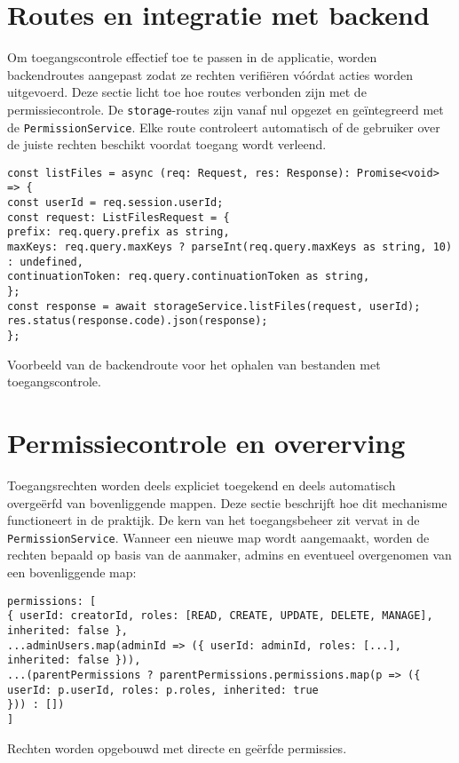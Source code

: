 \section{Routes en integratie met backend}
\label{sec:routes-backend}
Om toegangscontrole effectief toe te passen in de applicatie, worden backendroutes aangepast zodat ze rechten verifiëren vóórdat acties worden uitgevoerd. Deze sectie licht toe hoe routes verbonden zijn met de permissiecontrole.
De \texttt{storage}-routes zijn vanaf nul opgezet en geïntegreerd met de \texttt{PermissionService}. Elke route controleert automatisch of de gebruiker over de juiste rechten beschikt voordat toegang wordt verleend.
\begin{listing}[H]
\begin{verbatim}
const listFiles = async (req: Request, res: Response): Promise<void> => {
const userId = req.session.userId;
const request: ListFilesRequest = {
prefix: req.query.prefix as string,
maxKeys: req.query.maxKeys ? parseInt(req.query.maxKeys as string, 10) : undefined,
continuationToken: req.query.continuationToken as string,
};
const response = await storageService.listFiles(request, userId);
res.status(response.code).json(response);
};
\end{verbatim}
\caption[Route voor bestandsoverzicht]{Voorbeeld van de backendroute voor het ophalen van bestanden met toegangscontrole.}
\end{listing}
\section{Permissiecontrole en overerving}
\label{sec:permissiecontrole}
Toegangsrechten worden deels expliciet toegekend en deels automatisch overgeërfd van bovenliggende mappen. Deze sectie beschrijft hoe dit mechanisme functioneert in de praktijk.
De kern van het toegangsbeheer zit vervat in de \texttt{PermissionService}. Wanneer een nieuwe map wordt aangemaakt, worden de rechten bepaald op basis van de aanmaker, admins en eventueel overgenomen van een bovenliggende map:
\begin{listing}[H]
\begin{verbatim}
permissions: [
{ userId: creatorId, roles: [READ, CREATE, UPDATE, DELETE, MANAGE], inherited: false },
...adminUsers.map(adminId => ({ userId: adminId, roles: [...], inherited: false })),
...(parentPermissions ? parentPermissions.permissions.map(p => ({
userId: p.userId, roles: p.roles, inherited: true
})) : [])
]
\end{verbatim}
\caption[Opbouw van permissies bij mapcreatie]{Rechten worden opgebouwd met directe en geërfde permissies.}
\end{listing}

